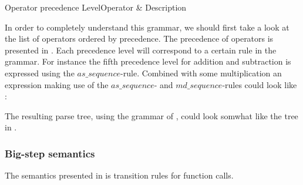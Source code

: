          {Operator precedence}
  {Level}{Operator & Description}{
}

In order to completely understand this grammar, we should first take a look at the list of
operators ordered by precedence. The precedence of operators is presented in
. Each precedence level will correspond to a certain rule
in the grammar. For instance the fifth precedence level for addition and subtraction is expressed
using the $as\_sequence$-rule. Combined with some multiplication an expression making use of
the $as\_sequence$- and $md\_sequence$-rules could look like :


The resulting parse tree, using the grammar of \productname{}, could look somwhat
like the tree in .



\subsubsection{Big-step semantics}

The semantics presented in  is transition rules for
function calls.

